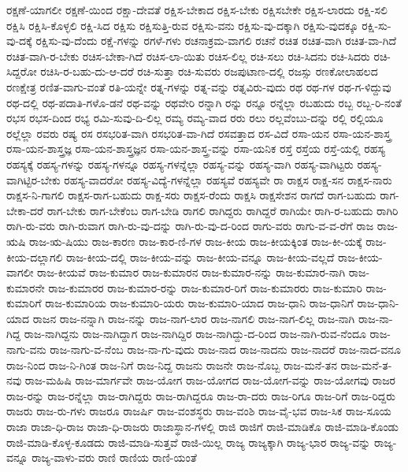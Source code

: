 {ರಕ್ಷಣೆ-ಯಾಗಲೀ
ರಕ್ಷಣೆ-ಯಿಂದ
ರಕ್ಷಾ-ದೇವತೆ
ರಕ್ಷಿಸ-ಬೇಕಾದ
ರಕ್ಷಿಸ-ಬೇಕು
ರಕ್ಷಿಸಬೇಕೇ
ರಕ್ಷಿಸ-ಲಾರದು
ರಕ್ಷಿ-ಸಲಿ
ರಕ್ಷಿಸಿ
ರಕ್ಷಿಸಿ-ಕೊಳ್ಳಲಿ
ರಕ್ಷಿ-ಸಿದ
ರಕ್ಷಿಸು
ರಕ್ಷಿಸುತ್ತಿ-ರುವ
ರಕ್ಷಿಸು-ವನು
ರಕ್ಷಿಸು-ವು-ದಕ್ಕಾಗಿ
ರಕ್ಷಿಸು-ವುದಕ್ಕೂ
ರಕ್ಷಿ-ಸು-ವು-ದಕ್ಕೆ
ರಕ್ಷಿಸು-ವು-ದೆಂದು
ರಕ್ಷೆ-ಗಳನ್ನು
ರಗಳೆ-ಗಳು
ರಚನಾಕ್ರಮ-ವಾಗಲಿ
ರಚನೆ
ರಚಿತ
ರಚಿತ-ವಾಗಿ
ರಚಿತ-ವಾ-ಗಿದೆ
ರಚಿತ-ವಾಗಿ-ರ-ಬೇಕು
ರಚಿಸ-ಬೇಕಾ-ಗಿದೆ
ರಚಿಸ-ಲಾ-ಯಿತು
ರಚಿಸ-ಲಿಲ್ಲ
ರಚಿ-ಸಲು
ರಚಿ-ಸಿದನು
ರಚಿ-ಸಿದರು
ರಚಿ-ಸಿದ್ದರೋ
ರಚಿಸಿ-ರ-ಬಹು-ದು-ಆ-ದರೆ
ರಚಿ-ಸುತ್ತಾ
ರಚಿ-ಸುವರು
ರಜಪುಟಾಣ-ದಲ್ಲಿ
ರಜಸ್ಸು
ರಣಕೋಲಾಹಲದ
ರಣಕ್ಷೇತ್ರ
ರಣಿತ-ವಾಗು-ವಂತೆ
ರತಿ-ಯನ್ನೇ
ರತ್ನ-ಗಳನ್ನು
ರತ್ನ-ವನ್ನು
ರತ್ನವಿರು-ವುದು
ರಥ
ರಥ-ಗಳ
ರಥ-ಗ-ಳಿದ್ದುವು
ರಥ-ದಲ್ಲಿ
ರಥ-ಪದಾತಿ-ಗಳೊ-ಡನೆ
ರಥ-ವನ್ನು
ರಥವೇರಿ
ರನ್ನಾಗಿ
ರನ್ನು
ರನ್ನೂ
ರನ್ನೆಲ್ಲಾ
ರಬಹುದು
ರಬ್ಬ
ರಬ್ಬ-ರಿ-ನಂತೆ
ರಭಸ
ರಭಸ-ದಿಂದ
ರಭ್ಯ
ರಮಿ-ಸುವು-ದಿ-ಲಿಲ್ಲ
ರಮ್ಯ
ರಮ್ಯ-ವಾದ
ರರು
ರಲು
ರಲ್ಲವೆಂಬು-ದನ್ನು
ರಲ್ಲಿ
ರಲ್ಲಿಯೂ
ರಲ್ಲೆಲ್ಲಾ
ರವರು
ರಷ್ಯ
ರಸ
ರಸಭರಿತ-ವಾಗಿ
ರಸಭರಿತ-ವಾ-ಗಿದೆ
ರಸವತ್ತಾದ
ರಸ-ವಿದೆ
ರಸಾ-ಯನ
ರಸಾ-ಯನ-ಶಾಸ್ತ್ರ
ರಸಾ-ಯನ-ಶಾಸ್ತ್ರಜ್ಞ
ರಸಾ-ಯನ-ಶಾಸ್ತ್ರಜ್ಞನ
ರಸಾ-ಯನ-ಶಾಸ್ತ್ರ-ವನ್ನು
ರಸಾ-ಯನಿಕ
ರಸ್ತೆ
ರಸ್ತೆಯ
ರಸ್ತೆ-ಯಲ್ಲಿ
ರಹಸ್ಯ
ರಹಸ್ಯಕ್ಕೆ
ರಹಸ್ಯ-ಗಳನ್ನು
ರಹಸ್ಯ-ಗಳನ್ನೂ
ರಹಸ್ಯ-ಗಳನ್ನೆಲ್ಲಾ
ರಹಸ್ಯ-ವನ್ನು
ರಹಸ್ಯ-ವಾಗಿ
ರಹಸ್ಯ-ವಾಗಿಟ್ಟರು
ರಹಸ್ಯ-ವಾಗಿಟ್ಟಿರ-ಬೇಕು
ರಹಸ್ಯ-ವಾದರೋ
ರಹಸ್ಯ-ವಿದ್ಯೆ-ಗಳನ್ನೆಲ್ಲಾ
ರಹಸ್ಯವೆ
ರಹಸ್ಯವೇ
ರಾ
ರಾಕ್ಷಸ
ರಾಕ್ಷ-ಸನ
ರಾಕ್ಷಸ-ನಾರು
ರಾಕ್ಷಸ-ನಿ-ಗಾಗಲಿ
ರಾಕ್ಷಸ-ರಾಗ-ಬಹುದು
ರಾಕ್ಷ-ಸರು
ರಾಕ್ಷಸ-ರೆಂದು
ರಾಕ್ಷಸಿ
ರಾಕ್ಷಸೇಶನ
ರಾಗದೆ
ರಾಗ-ಬಹುದು
ರಾಗ-ಬೇಕಾ-ದರೆ
ರಾಗ-ಬೇಕು
ರಾಗ-ಬೇಕೆಂಬ
ರಾಗ-ಬೇಡಿ
ರಾಗಲಿ
ರಾಗಿದ್ದರು
ರಾಗಿದ್ದರೆ
ರಾಗಿಯೇ
ರಾಗಿ-ರ-ಬಹುದು
ರಾಗಿರಿ
ರಾಗಿ-ರು-ವರು
ರಾಗಿ-ರುವಾಗ
ರಾಗಿ-ರು-ವು-ದನ್ನು
ರಾಗಿ-ರು-ವು-ದ-ರಿಂದ
ರಾಗು-ವರು
ರಾಗು-ವ-ವ-ರೆಗೆ
ರಾಜ
ರಾಜ-ಋಷಿ
ರಾಜ-ಋ-ಷಿಯು
ರಾಜ-ಕಾರಣ
ರಾಜ-ಕಾರ-ಣಿ-ಗಳ
ರಾಜ-ಕೀಯ
ರಾಜ-ಕೀಯಕ್ಕಿಂತ
ರಾಜ-ಕೀ-ಯಕ್ಕೆ
ರಾಜ-ಕೀಯ-ದಲ್ಲಾಗಲಿ
ರಾಜ-ಕೀಯ-ದಲ್ಲಿ
ರಾಜ-ಕೀಯ-ವನ್ನು
ರಾಜ-ಕೀಯ-ವನ್ನೂ
ರಾಜ-ಕೀಯ-ವಲ್ಲದೆ
ರಾಜ-ಕೀಯ-ವಾಗಲೀ
ರಾಜ-ಕೀಯವೆ
ರಾಜ-ಕುಮಾರ
ರಾಜ-ಕುಮಾರನ
ರಾಜ-ಕುಮಾರ-ನನ್ನು
ರಾಜ-ಕುಮಾರ-ನಾಗಿ
ರಾಜ-ಕುಮಾರನೇ
ರಾಜ-ಕುಮಾರರ
ರಾಜ-ಕುಮಾರ-ರನ್ನು
ರಾಜ-ಕುಮಾರ-ರಿಗೆ
ರಾಜ-ಕುಮಾರರು
ರಾಜ-ಕುಮಾರಿ
ರಾಜ-ಕುಮಾರಿಗೆ
ರಾಜ-ಕುಮಾರಿಯ
ರಾಜ-ಕುಮಾರಿ-ಯರು
ರಾಜ-ಕುಮಾರಿ-ಯಾದ
ರಾಜ-ಧಾನಿ
ರಾಜ-ಧಾನಿಗೆ
ರಾಜ-ಧಾನಿ-ಯಾದ
ರಾಜನ
ರಾಜ-ನನ್ನಾಗಿ
ರಾಜ-ನನ್ನು
ರಾಜ-ನಾಗ-ಲಾರ
ರಾಜ-ನಾಗಲಿ
ರಾಜ-ನಾಗ-ಲಿಲ್ಲ
ರಾಜ-ನಾಗಿ
ರಾಜ-ನಾ-ಗಿದ್ದ
ರಾಜ-ನಾಗಿದ್ದನು
ರಾಜ-ನಾಗಿದ್ದಾಗ
ರಾಜ-ನಾಗಿದ್ದಿರ
ರಾಜ-ನಾಗಿದ್ದು-ದ-ರಿಂದ
ರಾಜ-ನಾಗಿ-ರುವ-ನೆಂದೂ
ರಾಜ-ನಾಗು-ವನು
ರಾಜ-ನಾಗು-ವ-ನೆಂಬ
ರಾಜ-ನಾ-ಗು-ವುದು
ರಾಜ-ನಾದ
ರಾಜ-ನಾದನು
ರಾಜ-ನಾದರೆ
ರಾಜ-ನಾದ-ವನೂ
ರಾಜ-ನಿಂದ
ರಾಜ-ನಿ-ಗಿಂತ
ರಾಜ-ನಿಗೆ
ರಾಜ-ನಿದ್ದ
ರಾಜನು
ರಾಜನೇ
ರಾಜ-ನೊಬ್ಬ
ರಾಜ-ಮನೆ-ತನ
ರಾಜ-ಮನೆ-ತ-ನವು
ರಾಜ-ಮಹಿಷಿ
ರಾಜ-ಮಾರ್ಗವೇ
ರಾಜ-ಯೋಗ
ರಾಜ-ಯೋಗದ
ರಾಜ-ಯೋಗ-ವನ್ನು
ರಾಜ-ಯೋಗವು
ರಾಜರ
ರಾಜ-ರನ್ನು
ರಾಜ-ರನ್ನೆಲ್ಲಾ
ರಾಜ-ರಾಗಿದ್ದರು
ರಾಜ-ರಾಗಿದ್ದರೂ
ರಾಜ-ರಾ-ದರು
ರಾಜ-ರಿಗೂ
ರಾಜ-ರಿಗೆ
ರಾಜ-ರಿದ್ದರು
ರಾಜರು
ರಾಜ-ರು-ಗಳು
ರಾಜರೂ
ರಾಜರ್ಷಿ
ರಾಜ-ವಂಶಸ್ಥರು
ರಾಜ-ವಂಶಿ
ರಾಜ-ವೈ-ಭವ
ರಾಜ-ಸಿಕ
ರಾಜ-ಸೂಯ
ರಾಜಾ
ರಾಜಾ-ಧಿ-ರಾಜ
ರಾಜಾ-ಧಿ-ರಾಜರು
ರಾಜಾಸ್ಥಾನ-ಗಳಲ್ಲಿ
ರಾಜಿ
ರಾಜಿಗೆ
ರಾಜಿ-ಮಾಡಿಕೊ
ರಾಜಿ-ಮಾಡಿ-ಕೊಂಡು
ರಾಜಿ-ಮಾಡಿ-ಕೊಳ್ಳ-ಕೂಡದು
ರಾಜಿ-ಮಾಡಿ-ಸುತ್ತವೆ
ರಾಜಿ-ಯಿಲ್ಲ
ರಾಜ್ಯ
ರಾಜ್ಯಕ್ಕಾಗಿ
ರಾಜ್ಯ-ಭಾರ
ರಾಜ್ಯ-ವನ್ನು
ರಾಜ್ಯ-ವನ್ನೂ
ರಾಜ್ಯ-ವಾಳು-ವರು
ರಾಣಿ
ರಾಣಿಯ
ರಾಣಿ-ಯಂತೆ
}

